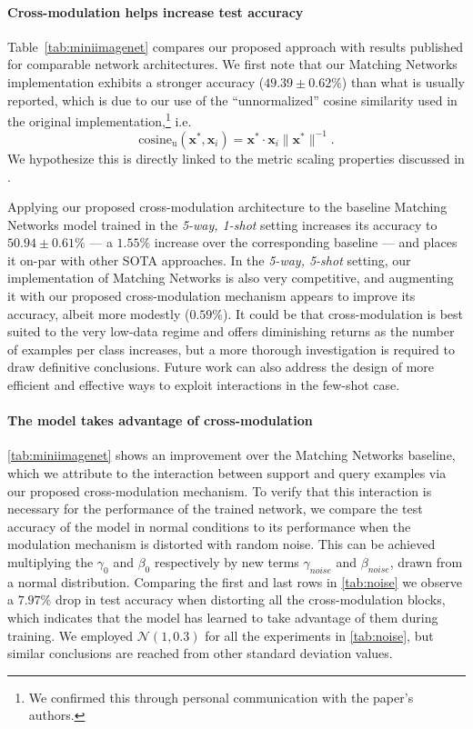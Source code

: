 \documentclass{article}
\begin{document}
\paragraph{Cross-modulation helps increase test accuracy}

Table~\ref{tab:miniimagenet} compares our proposed approach with
results published for comparable network architectures.  We first note
that our Matching Networks implementation exhibits a stronger accuracy
($49.39 \pm 0.62\%$) than what is usually reported, which is due to
our use of the ``unnormalized'' cosine similarity used in the original
implementation,\footnote{We confirmed this through personal
  communication with the paper's authors.} i.e.
\begin{equation}
    \mathrm{cosine_u}(\mathbf{x}^*, \mathbf{x}_i) = \mathbf{x}^* \cdot \mathbf{x}_i \|\mathbf{x}^*\|^{-1}.
\end{equation}
We hypothesize this is directly linked to the metric scaling properties
discussed in \cite{oreshkin18tadam}.

Applying our proposed cross-modulation architecture to the baseline
Matching Networks model trained in the {\em 5-way, 1-shot} setting
increases its accuracy to $50.94 \pm 0.61\%$ --- a $1.55\%$ increase over
the corresponding baseline --- and places it on-par with other SOTA
approaches. In the {\em 5-way, 5-shot} setting, our implementation of
Matching Networks is also very competitive, and augmenting it with our proposed
cross-modulation mechanism appears to improve its accuracy, albeit more modestly ($0.59\%$). It could be that cross-modulation is best suited to the very
low-data regime and offers diminishing returns as the number of examples per
class increases, but a more thorough investigation is required to draw definitive
conclusions. Future work can also address the design of more efficient and
effective ways to exploit interactions in the few-shot case.


\paragraph{The model takes advantage of cross-modulation}

\autoref{tab:miniimagenet} shows an improvement over the Matching
Networks baseline, which we attribute to the interaction between
support and query examples via our proposed cross-modulation
mechanism. To verify that this interaction is necessary for the
performance of the trained network, we compare the test accuracy of
the model in normal conditions to its performance when the modulation
mechanism is distorted with random noise. This can be achieved
multiplying the $\gamma_0$ and $\beta_0$ respectively by new terms
$\gamma_{noise}$ and $\beta_{noise}$, drawn from a normal
distribution. Comparing the first and last rows in \autoref{tab:noise}
we observe a $7.97\%$ drop in test accuracy when distorting all the
cross-modulation blocks, which indicates that the model has learned to
take advantage of them during training. We employed
$\mathcal{N}(1, 0.3)$ for all the experiments in \autoref{tab:noise},
but similar conclusions are reached from other standard deviation values.
\end{document}
